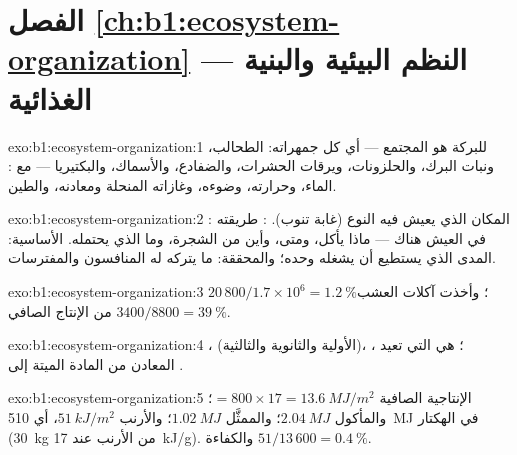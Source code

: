 \section*{الفصل \ref{ch:b1:ecosystem-organization} --- النظم البيئية والبنية الغذائية}

\begin{solution}{exo:b1:ecosystem-organization:1}
 للبركة هو المجتمع --- أي كل جمهراته: الطحالب،
ونبات البرك، والحلزونات، ويرقات الحشرات، والضفادع، والأسماك،
والبكتيريا --- مع : الماء، وحرارته، وضوءه، وغازاته
المنحلة ومعادنه، والطين.
\end{solution}

\begin{solution}{exo:b1:ecosystem-organization:2}
: المكان الذي يعيش فيه النوع (غابة تنوب). : طريقته
في العيش هناك --- ماذا يأكل، ومتى، وأين من الشجرة، وما الذي
يحتمله.  الأساسية: المدى الذي يستطيع أن يشغله وحده؛
والمحققة: ما يتركه له المنافسون والمفترسات.
\end{solution}

\begin{solution}{exo:b1:ecosystem-organization:3}
$20\,800/1.7\times 10^6 = \qty{1.2}{\%}$؛ وأخذت آكلات العشب
$3400/8800 = \qty{39}{\%}$ من الإنتاج الصافي.
\end{solution}

\begin{solution}{exo:b1:ecosystem-organization:4}
،  (الأولية والثانوية والثالثية)، ،
؛  هي التي تعيد المعادن من المادة الميتة
إلى .
\end{solution}

\begin{solution}{exo:b1:ecosystem-organization:5}
الإنتاجية الصافية $= 800\times 17 = \qty{13.6}{MJ/m^2}$؛ والمأكول $\qty{2.04}{MJ}$؛
والممثَّل $\qty{1.02}{MJ}$؛ والأرنب $\qty{51}{kJ/m^2}$، أي
\qty{510}{MJ} في الهكتار (\qty{30}{kg} من الأرنب عند \qty{17}{kJ/g}).
والكفاءة $51/13\,600 = \qty{0.4}{\%}$.
\end{solution}

